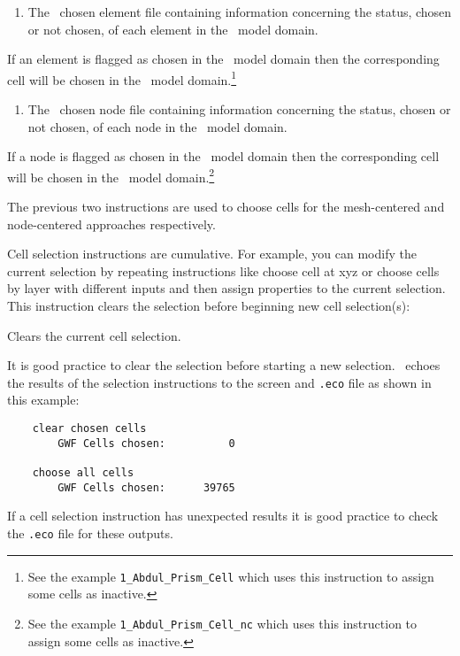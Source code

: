 {
    {
        \squish
        \begin{enumerate}
        \item {}  The \gb\ chosen element file  containing information concerning the status, chosen or not chosen, of each element in the \gb\ model domain.
        \end{enumerate}
          If an element is flagged as chosen in the \gb\ model domain then the corresponding cell will be chosen in the \mfus\ model domain.\footnote{ See the  example \texttt{1\_Abdul\_Prism\_Cell} which uses this instruction to assign some cells as inactive.}
    }

    {
        \squish
        \begin{enumerate}
        \item {}  The \gb\ chosen node file  containing information concerning the status, chosen or not chosen, of each node in the \gb\ model domain.
        \end{enumerate}
          If a node is flagged as chosen in the \gb\ model domain then the corresponding cell will be chosen in the \mfus\ model domain.\footnote{ See the  example \texttt{1\_Abdul\_Prism\_Cell\_nc} which uses this instruction to assign some cells as inactive.}
    }

The previous two instructions are used to choose cells for the mesh-centered and node-centered approaches respectively.

\pagebreak
Cell selection instructions are cumulative.  For example, you can modify the current selection by repeating instructions like  \textsf{choose cell at xyz} or \textsf{choose cells by layer} with different inputs and then assign properties to the current selection.  This instruction clears the selection before beginning new cell selection(s):

    {Clears the current cell selection.
     }

It is good practice to clear the selection before starting a new selection. \mut\ echoes the results of the selection instructions to the screen and \texttt{.eco} file as shown in this example:
\begin{verbatim}
    clear chosen cells
    	GWF Cells chosen:          0

    choose all cells
    	GWF Cells chosen:      39765
\end{verbatim}
If a cell selection instruction has unexpected results it is good practice to check the \texttt{.eco} file for these outputs.

}
